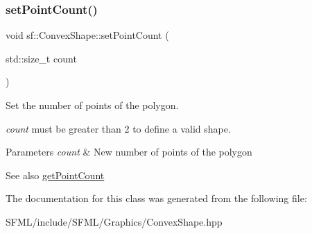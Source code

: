 \subsubsection{\texorpdfstring{setPointCount()}{setPointCount()}}
{\footnotesize\ttfamily void sf\+::\+Convex\+Shape\+::set\+Point\+Count (\begin{DoxyParamCaption}\item[{std\+::size\+\_\+t}]{count }\end{DoxyParamCaption})}



Set the number of points of the polygon. 

{\itshape count} must be greater than 2 to define a valid shape.


\begin{DoxyParams}{Parameters}
{\em count} & New number of points of the polygon\\
\hline
\end{DoxyParams}
\begin{DoxySeeAlso}{See also}
\mbox{\hyperlink{classsf_1_1_convex_shape_a0c54b8d48fe4e13414f6e667dbfc22a3}{get\+Point\+Count}} \begin{DoxyVerb}\end{DoxyVerb}
 
\end{DoxySeeAlso}


The documentation for this class was generated from the following file\+:\begin{DoxyCompactItemize}
\item 
S\+F\+M\+L/include/\+S\+F\+M\+L/\+Graphics/Convex\+Shape.\+hpp\end{DoxyCompactItemize}
